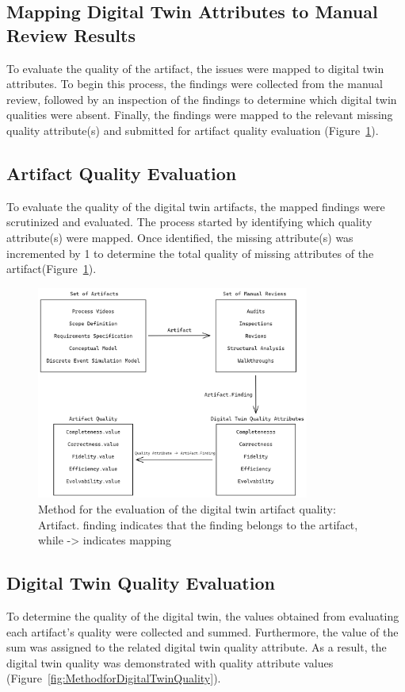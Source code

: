 \documentclass{llncs}
\begin{document}
    \subsection{Mapping Digital Twin Attributes to Manual Review Results}
    To evaluate the quality of the artifact, the issues were mapped to digital twin attributes. 
    To begin this process, the findings were collected from the manual review, followed by an inspection of the findings to determine which digital twin qualities were absent. 
    Finally, the findings were mapped to the relevant missing quality attribute(s) and submitted for artifact quality evaluation (Figure~\ref{fig:Method}). 
    
    \subsection{Artifact Quality Evaluation}
    To evaluate the quality of the digital twin artifacts, the mapped findings were scrutinized and evaluated. 
    The process started by identifying which quality attribute(s) were mapped. 
    Once identified, the missing attribute(s) was incremented by 1 to determine the total quality of missing attributes of the artifact(Figure~\ref{fig:Method}). 
    
    \begin{figure}[htbp]
        \centering
        \includegraphics[width = 0.8\textwidth]{RequirementSpecifications.png}
        \caption{Method for the evaluation of the digital twin artifact quality: Artifact. finding indicates that the finding belongs to the artifact, while -> indicates mapping}\label{fig:Method}
    \end{figure}
    
    \subsection{Digital Twin Quality Evaluation}
    To determine the quality of the digital twin, 
    the values obtained from evaluating each artifact's quality were collected and summed. 
    Furthermore, the value of the sum was assigned to the related digital twin quality attribute. 
    As a result, the digital twin quality was demonstrated with quality attribute values (Figure~\ref{fig:MethodforDigitalTwinQuality}).    
  
\end{document}
